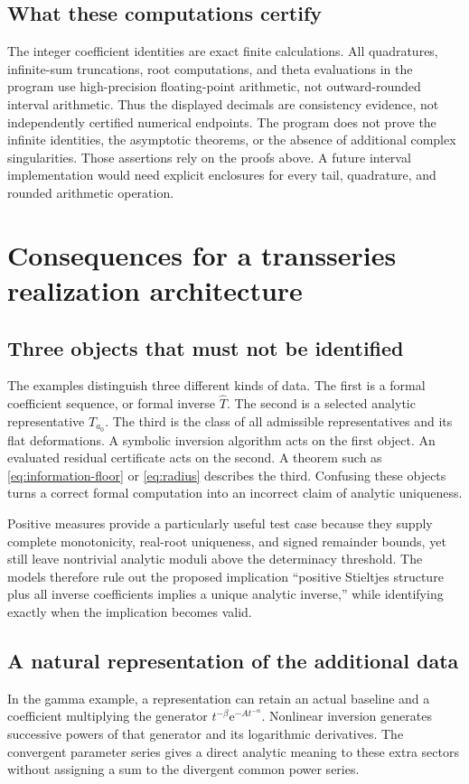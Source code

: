 \documentclass[11pt,a4paper]{article}
\numberwithin{equation}{section}
\theoremstyle{definition}
\theoremstyle{remark}
\newcommand{\ee}{\mathrm e}
\begin{document}
\subsection{What these computations certify}
The integer coefficient identities are exact finite calculations.
All quadratures, infinite-sum truncations, root computations, and
theta evaluations in the program use high-precision floating-point
arithmetic, not outward-rounded interval arithmetic. Thus the displayed
decimals are consistency evidence, not independently certified numerical
endpoints. The program does not prove the infinite identities, the
asymptotic theorems, or the absence of additional complex singularities.
Those assertions rely on the proofs above. A future interval
implementation would need explicit enclosures for every tail,
quadrature, and rounded arithmetic operation.

\section{Consequences for a transseries realization architecture}
\label{sec:architecture}

\subsection{Three objects that must not be identified}
The examples distinguish three different kinds of data. The first is a
formal coefficient sequence, or formal inverse \(\widehat T\). The
second is a selected analytic representative \(T_{a_0}\). The third is
the class of all admissible representatives and its flat deformations.
A symbolic inversion algorithm acts on the first object. An evaluated
residual certificate acts on the second. A theorem such as
\eqref{eq:information-floor} or \eqref{eq:radius} describes the third.
Confusing these objects turns a correct formal computation into an
incorrect claim of analytic uniqueness.

Positive measures provide a particularly useful test case because they
supply complete monotonicity, real-root uniqueness, and signed remainder
bounds, yet still leave nontrivial analytic moduli above the determinacy
threshold. The models therefore rule out the proposed implication
``positive Stieltjes structure plus all inverse coefficients implies a
unique analytic inverse,'' while identifying exactly when the
implication becomes valid.

\subsection{A natural representation of the additional data}
In the gamma example, a representation can retain an actual baseline
and a coefficient multiplying the generator
\(t^{-\beta}\ee^{-At^{-\alpha}}\). Nonlinear inversion generates
successive powers of that generator and its logarithmic derivatives.
The convergent parameter series gives a direct analytic meaning to
these extra sectors without assigning a sum to the divergent common
power series.
\end{document}
